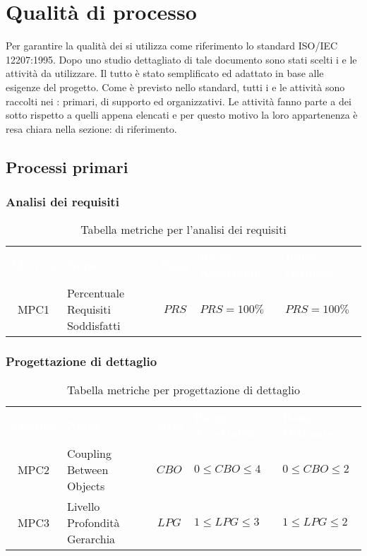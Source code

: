 \section{Qualità di processo}
Per garantire la qualità dei  si utilizza come riferimento lo standard ISO/IEC 12207:1995. Dopo uno studio dettagliato di tale documento sono stati scelti i 
e le attività da utilizzare. Il tutto è stato semplificato ed adattato in base alle esigenze del progetto. Come è previsto nello standard, tutti i  e le attività sono raccolti 
nei : primari, di supporto ed organizzativi. Le attività fanno parte a dei sotto  rispetto a quelli appena elencati e per questo motivo la loro 
appartenenza è resa chiara nella sezione:  di riferimento.

\subsection{Processi primari}

\subsubsection{Analisi dei requisiti}
   \renewcommand{\arraystretch}{1.5}
   \begin{longtable}{ c C{4cm} c C{3.5cm} C{3.5cm}}
   	\caption{Tabella metriche per l'analisi dei requisiti}\\
   	\textcolor{white}{\textbf{Metrica}} & \textcolor{white}{\textbf{Nome}} & \textcolor{white}{\textbf{Sigla}} & \textcolor{white}{\textbf{Range Accettabile}} & \textcolor{white}{\textbf{Range Ottimale}}\\
   	MPC1 & Percentuale Requisiti Soddisfatti & $PRS$ & $PRS = 100\%$ & $PRS = 100\%$ \\
   \end{longtable}
\vspace{0.3cm}
\subsubsection{Progettazione di dettaglio}
\renewcommand{\arraystretch}{1.5}
\begin{longtable}{ c C{4cm} c C{3.5cm} C{3.5cm}}
	\caption{Tabella metriche per progettazione di dettaglio}\\
	\textcolor{white}{\textbf{Metrica}} & \textcolor{white}{\textbf{Nome}} & \textcolor{white}{\textbf{Sigla}} & \textcolor{white}{\textbf{Range Accettabile}} & \textcolor{white}{\textbf{Range Ottimale}}\\
    MPC2 & Coupling Between Objects & $CBO$ & $0 \leq CBO \leq 4$ & $0 \leq CBO \leq 2$ \\
    MPC3 & Livello Profondità Gerarchia & $LPG$ &  $1 \leq LPG \leq 3$ &  $1 \leq LPG \leq 2$ \\
\end{longtable}

